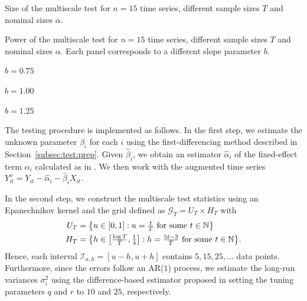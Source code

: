 \documentclass[a4paper,12pt]{article}
\makeatletter
\renewcommand{\eqref}[1]{\tagform@{\ref{#1}}}
\makeatother
\begin{document}
\begin{table}[t]
\footnotesize{
\begin{center}
\caption{Size of the multiscale test for $n=15$ time series, different sample sizes $T$ and nominal sizes $\alpha$.}
\label{tab:size}
\renewcommand{\arraystretch}{1.2}

\end{center}}
\footnotesize{
\begin{center}
\caption{Power of the multiscale test for $n=15$ time series, different sample sizes $T$ and nominal sizes $\alpha$. Each panel corresponds to a different slope parameter $b$.}\label{tab:power}
\begin{subtable}[b]{0.32\textwidth}
\centering
\caption{$b = 0.75$}\label{tab:power_075}
\renewcommand{\arraystretch}{1.2}

\end{subtable}
\begin{subtable}[b]{0.32\textwidth}
\centering
\caption{$b = 1.00$}\label{tab:power_100}
\renewcommand{\arraystretch}{1.2}

\end{subtable}
\begin{subtable}[b]{0.32\textwidth}
\centering
\caption{$b = 1.25$}\label{tab:power_125}
\renewcommand{\arraystretch}{1.2}

\end{subtable}
\end{center}}
\vspace{-0.4cm}
\end{table}
%
The testing procedure is implemented as follows. In the first step, we estimate the unknown parameter $\beta_i$ for each $i$ using the first-differencing method described in Section~\ref{subsec:test:prep}. Given $\widehat{\beta}_i$, we obtain an estimator $\widehat{\alpha}_i$ of the fixed-effect term $\alpha_i$ calculated as in \eqref{eq:alpha:est}. We then work with the augmented time series $Y_{it}^o = Y_{it} - \widehat{\alpha}_i - \widehat{\beta}_i X_{it}$.

In the second step, we construct the multiscale test statistics using an Epanechnikov kernel and the grid defined as $\mathcal{G}_T = U_T \times H_T$ with 
\begin{align*}
U_T & = \big\{ u \in [0,1]: u = \textstyle{\frac{t}{T}} \text{ for some } t \in \mathbb{N} \big\} \\
H_T & = \big\{ h \in \big[ \textstyle{\frac{\log T}{T}}, \textstyle{\frac{1}{4}} \big]:  h = \textstyle{\frac{5 t -3}{T}} \text{ for some } t \in \mathbb{N} \big\}. 
\end{align*}
Hence, each interval $\mathcal{I}_{u, h} = [u-h, u+h]$ contains $5, 15, 25, \ldots$ data points. Furthermore, since the errors follow an AR($1$) process, we estimate the long-run variances $\sigma_i^2$ using the difference-based estimator proposed in \cite{KhismatullinaVogt2020} setting the tuning parameters $q$ and $r$ to $10$ and $25$, respectively.
\end{document}
